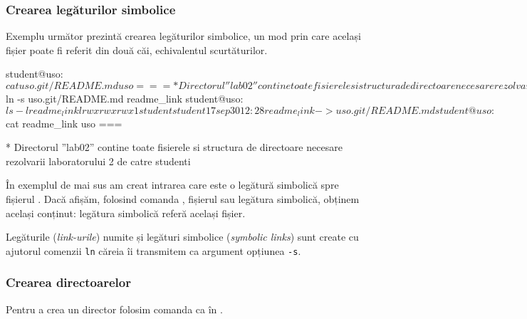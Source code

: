 \subsubsection{Crearea legăturilor simbolice}
\label{sec:fs:link}

Exemplu următor prezintă crearea legăturilor simbolice, un mod prin care același fișier poate fi referit din două căi, echivalentul scurtăturilor.

\begin{screen}
student@uso:~$ cat uso.git/README.md
uso
===

   * Directorul ''lab02'' contine toate fisierele si structura de directoare necesare rezolvarii laboratorului 2 de catre studenti
student@uso:~$ ln -s uso.git/README.md readme_link
student@uso:~$ ls -l readme_link
lrwxrwxrwx 1 student student 17 sep 30 12:28 readme_link -> uso.git/README.md
student@uso:~$ cat readme_link
uso
===

   * Directorul ''lab02'' contine toate fisierele si structura de directoare necesare rezolvarii laboratorului 2 de catre studenti
\end{screen}

În exemplul de mai sus am creat intrarea  care este o legătură simbolică spre fișierul . Dacă afișăm, folosind comanda , fișierul sau legătura simbolică, obținem același conținut: legătura simbolică referă același fișier.

Legăturile (\textit{link-urile}) numite și legături simbolice (\textit{symbolic links}) sunt create cu ajutorul comenzii \texttt{ln} căreia îi transmitem ca argument opțiunea \texttt{-s}.

\subsubsection{Crearea directoarelor}
\label{sec:fs:mkdir}

Pentru a crea un director folosim comanda  ca în .


